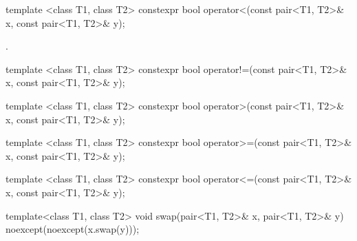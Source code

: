 %
\begin{itemdecl}
template <class T1, class T2>
  constexpr bool operator<(const pair<T1, T2>& x, const pair<T1, T2>& y);
\end{itemdecl}

\begin{itemdescr}
\pnum
\returns
{}.
\end{itemdescr}

%
\begin{itemdecl}
template <class T1, class T2>
  constexpr bool operator!=(const pair<T1, T2>& x, const pair<T1, T2>& y);
\end{itemdecl}

\begin{itemdescr}
\pnum
\returns {}
\end{itemdescr}

%
\begin{itemdecl}
template <class T1, class T2>
  constexpr bool operator>(const pair<T1, T2>& x, const pair<T1, T2>& y);
\end{itemdecl}

\begin{itemdescr}
\pnum
\returns {}
\end{itemdescr}

%
\begin{itemdecl}
template <class T1, class T2>
  constexpr bool operator>=(const pair<T1, T2>& x, const pair<T1, T2>& y);
\end{itemdecl}

\begin{itemdescr}
\pnum
\returns {}
\end{itemdescr}

%
\begin{itemdecl}
template <class T1, class T2>
  constexpr bool operator<=(const pair<T1, T2>& x, const pair<T1, T2>& y);
\end{itemdecl}

\begin{itemdescr}
\pnum
\returns {}
\end{itemdescr}


%
\begin{itemdecl}
template<class T1, class T2> void swap(pair<T1, T2>& x, pair<T1, T2>& y)
  noexcept(noexcept(x.swap(y)));
\end{itemdecl}

